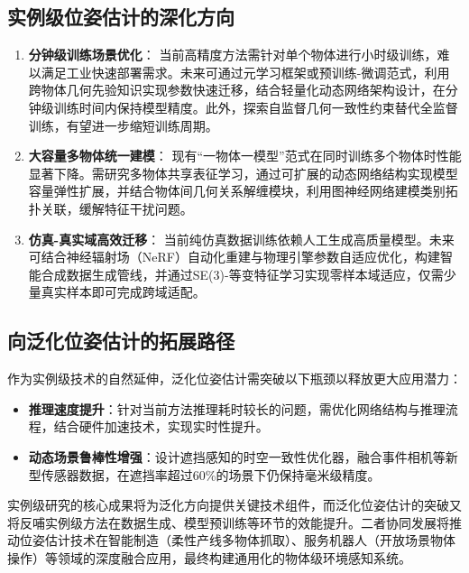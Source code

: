 \subsection{实例级位姿估计的深化方向}
\begin{enumerate}
\item \textbf{分钟级训练场景优化}：
当前高精度方法需针对单个物体进行小时级训练，难以满足工业快速部署需求。未来可通过元学习框架或预训练-微调范式，利用跨物体几何先验知识实现参数快速迁移，结合轻量化动态网络架构设计，在分钟级训练时间内保持模型精度。此外，探索自监督几何一致性约束替代全监督训练，有望进一步缩短训练周期。
\item \textbf{大容量多物体统一建模}：
现有“一物体一模型”范式在同时训练多个物体时性能显著下降。需研究多物体共享表征学习，通过可扩展的动态网络结构实现模型容量弹性扩展，并结合物体间几何关系解缠模块，利用图神经网络建模类别拓扑关联，缓解特征干扰问题。
\item \textbf{仿真-真实域高效迁移}：
当前纯仿真数据训练依赖人工生成高质量模型。未来可结合神经辐射场（NeRF）自动化重建与物理引擎参数自适应优化，构建智能合成数据生成管线，并通过SE(3)-等变特征学习实现零样本域适应，仅需少量真实样本即可完成跨域适配。
\end{enumerate}
\subsection{向泛化位姿估计的拓展路径}
作为实例级技术的自然延伸，泛化位姿估计需突破以下瓶颈以释放更大应用潜力：
\begin{itemize}
\item \textbf{推理速度提升}：针对当前方法推理耗时较长的问题，需优化网络结构与推理流程，结合硬件加速技术，实现实时性提升。
\item \textbf{动态场景鲁棒性增强}：设计遮挡感知的时空一致性优化器，融合事件相机等新型传感器数据，在遮挡率超过60\%的场景下仍保持毫米级精度。
\end{itemize}

\noindent 实例级研究的核心成果将为泛化方向提供关键技术组件，而泛化位姿估计的突破又将反哺实例级方法在数据生成、模型预训练等环节的效能提升。二者协同发展将推动位姿估计技术在智能制造（柔性产线多物体抓取）、服务机器人（开放场景物体操作）等领域的深度融合应用，最终构建通用化的物体级环境感知系统。